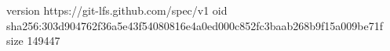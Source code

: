 version https://git-lfs.github.com/spec/v1
oid sha256:303d904762f36a5e43f54080816e4a0ed000c852fc3baab268b9f15a009be71f
size 149447
